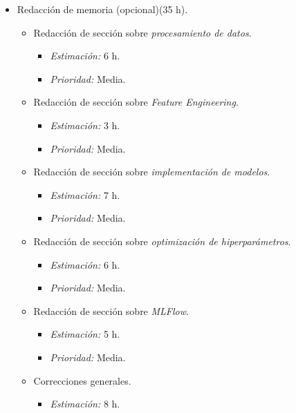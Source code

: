 \documentclass[
11pt, %
]{charter}
\begin{document}
\begin{itemize}
    \item Redacción de memoria (opcional)(35 h).
        \begin{itemize}
            \item Redacción de sección sobre \textit{procesamiento de datos}.
                \begin{itemize}
                    \item \textit{Estimación:} 6 h.
                    \item \textit{Prioridad:} Media.
                \end{itemize}
            \item Redacción de sección sobre \textit{Feature Engineering}.
                \begin{itemize}
                    \item \textit{Estimación:} 3 h.
                    \item \textit{Prioridad:} Media.
                \end{itemize}
            \item Redacción de sección sobre \textit{implementación de modelos}.
                \begin{itemize}
                    \item \textit{Estimación:} 7 h.
                    \item \textit{Prioridad:} Media.
                \end{itemize}
            \item Redacción de sección sobre \textit{optimización de hiperparámetros}.
                \begin{itemize}
                    \item \textit{Estimación:} 6 h.
                    \item \textit{Prioridad:} Media.
                \end{itemize}
            \item Redacción de sección sobre \textit{MLFlow}.
                \begin{itemize}
                    \item \textit{Estimación:} 5 h.
                    \item \textit{Prioridad:} Media.
                \end{itemize}
            \item Correcciones generales.
                \begin{itemize}
                    \item \textit{Estimación:} 8 h.

\end{itemize}
\end{itemize}
\end{itemize}
\end{document}
